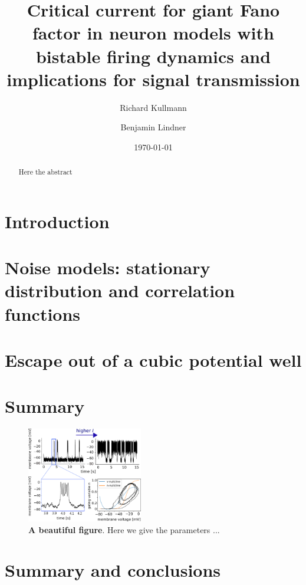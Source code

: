 \documentclass[twocolumn,showpacs,aps,superscriptaddress]{article}
\begin{document}
\title{Critical current for giant Fano factor  in neuron models with bistable firing dynamics and implications for signal transmission}

\author{Richard Kullmann}

\author{Benjamin Lindner}
\date{\today}

\begin{abstract}
Here the abstract
\end{abstract}	

\maketitle

\section{Introduction}

\section{Noise models: stationary distribution and correlation functions}

\section{Escape out of a cubic potential well}

\section{Summary}
\begin{figure}[h]
\centering
\includegraphics[width=0.45\textwidth]{vtmerge.pdf}
\caption{{\bf A beautiful figure}. Here we give the parameters ...
}
\label{fig:model}
\end{figure}
\section{Summary and conclusions}



\end{document}
